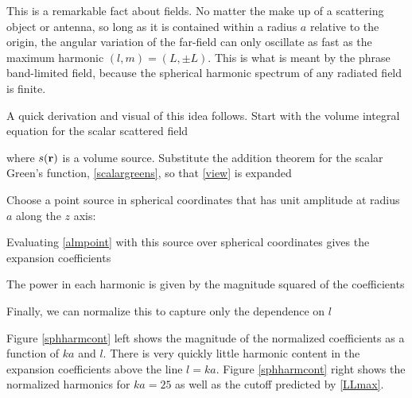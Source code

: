 This is a remarkable fact about fields. No matter the make up of a scattering object or antenna, so long as it is contained within a radius $a$ relative to the origin, the angular variation of the far-field can only oscillate as fast as the maximum harmonic $(l,m) = (L,\pm L)$.  This is what is meant by the phrase band-limited field, because the spherical harmonic spectrum of any radiated field is finite. 

A quick derivation and visual of this idea follows. Start with the volume integral equation for the scalar scattered field

\noindent where $s(\mathbf{r})$ is a volume source. Substitute the addition theorem for the scalar Green's function, \eqref{scalargreens}, so that \eqref{view} is expanded 

Choose a point source in spherical coordinates that has unit amplitude at radius $a$ along the $z$ axis:

Evaluating \eqref{almpoint} with this source over spherical coordinates gives the expansion coefficients

The power in each harmonic is given by the magnitude squared of the coefficients

Finally, we can normalize this to capture only the dependence on $l$

Figure \ref{sphharmcont} left shows the magnitude of the normalized coefficients as a function of $ka$ and $l$. There is very quickly little harmonic content in the expansion coefficients above the line $l = ka$.  Figure \ref{sphharmcont} right shows the normalized harmonics for $ka = 25$ as well as the cutoff predicted by \eqref{LLmax}. 


